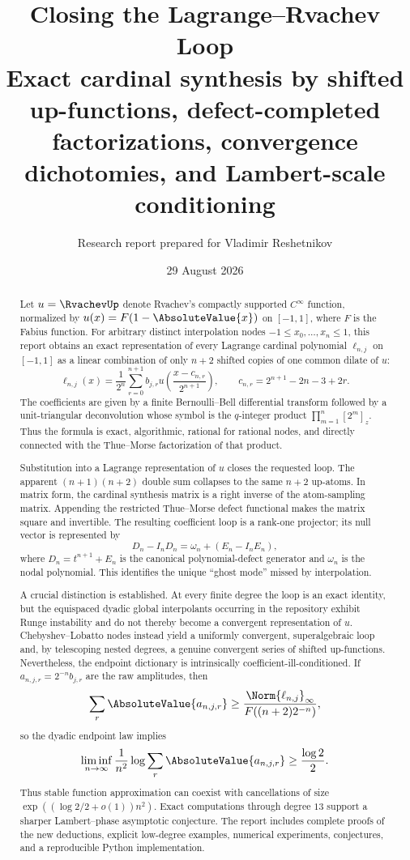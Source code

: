 \documentclass[11pt,oneside]{article}
\title{\textbf{Closing the Lagrange--Rvachev Loop}\\[0.5em]
\large Exact cardinal synthesis by shifted up-functions, defect-completed
factorizations, convergence dichotomies, and Lambert-scale conditioning}
\author{Research report prepared for Vladimir Reshetnikov}
\date{29 August 2026}
\theoremstyle{definition}
\theoremstyle{remark}
\newcommand{\1}{\mathbf{1}}
\begin{document}
\maketitle

\begin{abstract}
Let $u=\RvachevUp$ denote Rvachev's compactly supported $C^\infty$ function,
normalized by $u(x)=F(1-\AbsoluteValue{x})$ on $[-1,1]$, where $F$ is the Fabius
function.  For arbitrary distinct interpolation nodes
$-1\le x_0,\ldots,x_n\le1$, this report obtains an exact representation of
every Lagrange cardinal polynomial $\ell_{n,j}$ on $[-1,1]$ as a linear
combination of only $n+2$ shifted copies of one common dilate of $u$:
\[
 \ell_{n,j}(x)=\frac1{2^n}\sum_{r=0}^{n+1}b_{j,r}
 u\!\left(\frac{x-c_{n,r}}{2^{n+1}}\right),
 \qquad c_{n,r}=2^{n+1}-2n-3+2r.
\]
The coefficients are given by a finite Bernoulli--Bell differential
transform followed by a unit-triangular deconvolution whose symbol is the
$q$-integer product $\prod_{m=1}^n[2^m]_z$.  Thus the formula is exact,
algorithmic, rational for rational nodes, and directly connected with the
Thue--Morse factorization of that product.

Substitution into a Lagrange representation of $u$ closes the requested
loop.  The apparent $(n+1)(n+2)$ double sum collapses to the same $n+2$
up-atoms.  In matrix form, the cardinal synthesis matrix is a right inverse
of the atom-sampling matrix.  Appending the restricted Thue--Morse defect
functional makes the matrix square and invertible.  The resulting
coefficient loop is a rank-one projector; its null vector is represented by
\[
 D_n-I_nD_n=\omega_n+(E_n-I_nE_n),
\]
where $D_n=t^{n+1}+E_n$ is the canonical polynomial-defect generator and
$\omega_n$ is the nodal polynomial.  This identifies the unique ``ghost
mode'' missed by interpolation.

A crucial distinction is established.  At every finite degree the loop is
an exact identity, but the equispaced dyadic global interpolants occurring in
the repository exhibit Runge instability and do not thereby become a
convergent representation of $u$.  Chebyshev--Lobatto nodes instead yield a
uniformly convergent, superalgebraic loop and, by telescoping nested degrees,
a genuine convergent series of shifted up-functions.  Nevertheless, the
endpoint dictionary is intrinsically coefficient-ill-conditioned.  If
$a_{n,j,r}=2^{-n}b_{j,r}$ are the raw amplitudes, then
\[
 \sum_r\AbsoluteValue{a_{n,j,r}}\ge
 \frac{\Norm{\ell_{n,j}}_\infty}{F((n+2)2^{-n})},
\]
so the dyadic endpoint law implies
\[
 \liminf_{n\to\infty}\frac1{n^2}
 \log\sum_r\AbsoluteValue{a_{n,j,r}}\ge\frac{\log2}{2}.
\]
Thus stable function approximation can coexist with cancellations of size
$\exp((\log2/2+o(1))n^2)$.  Exact computations through degree $13$ support a
sharper Lambert--phase asymptotic conjecture.  The report includes complete
proofs of the new deductions, explicit low-degree examples, numerical
experiments, conjectures, and a reproducible Python implementation.
\end{abstract}
\end{document}
